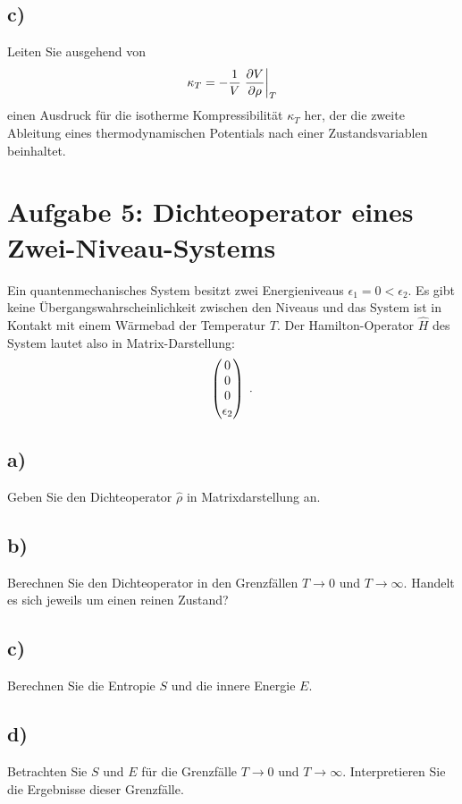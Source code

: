 \subsection{c)}
Leiten Sie ausgehend von
\[
    \kappa_T = -\frac{1}{V}\left.\frac{\partial V}{\partial \rho}\right\rvert_{T}    
\]
einen Ausdruck für die isotherme Kompressibilität $\kappa_T$ her, der die zweite Ableitung eines thermodynamischen Potentials nach einer Zustandsvariablen beinhaltet.

\section{Aufgabe 5: Dichteoperator eines Zwei-Niveau-Systems}
Ein quantenmechanisches System besitzt zwei Energieniveaus $\epsilon_1 = 0 < \epsilon_2$.
Es gibt keine Übergangswahrscheinlichkeit zwischen den Niveaus und das System ist in Kontakt mit einem Wärmebad der Temperatur $T$.
Der Hamilton-Operator $\hat H$ des System lautet also in Matrix-Darstellung:
\[
    \begin{pmatrix}0\\0\\0\\\epsilon_2\end{pmatrix} \;.    
\]

\subsection{a)}
Geben Sie den Dichteoperator $\hat\rho$ in Matrixdarstellung an.

\subsection{b)}
Berechnen Sie den Dichteoperator in den Grenzfällen $T \to 0$ und $T \to \infty$.
Handelt es sich jeweils um einen reinen Zustand?

\subsection{c)}
Berechnen Sie die Entropie $S$ und die innere Energie $E$.

\subsection{d)}
Betrachten Sie $S$ und $E$ für die Grenzfälle $T \to 0$ und $T \to \infty$.
Interpretieren Sie die Ergebnisse dieser Grenzfälle.


